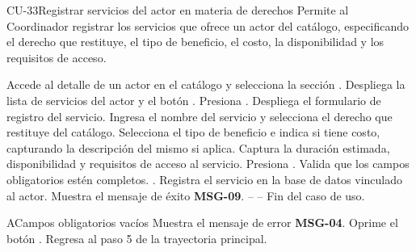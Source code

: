 \begin{UseCase}{CU-33}{Registrar servicios del actor en materia de derechos}{
	Permite al Coordinador registrar los servicios que ofrece un actor del catálogo, especificando el derecho que restituye, el tipo de beneficio, el costo, la disponibilidad y los requisitos de acceso.
}
\end{UseCase}

\begin{UCtrayectoria}
	\UCpaso[\UCactor] Accede al detalle de un actor en el catálogo y selecciona la sección .
	\UCpaso Despliega la lista de servicios del actor y el botón .
	\UCpaso[\UCactor] Presiona .
	\UCpaso Despliega el formulario de registro del servicio.
	\UCpaso[\UCactor] Ingresa el nombre del servicio y selecciona el derecho que restituye del catálogo.
	\UCpaso[\UCactor] Selecciona el tipo de beneficio e indica si tiene costo, capturando la descripción del mismo si aplica.
	\UCpaso[\UCactor] Captura la duración estimada, disponibilidad y requisitos de acceso al servicio.
	\UCpaso[\UCactor] Presiona .
	\UCpaso Valida que los campos obligatorios estén completos. .
	\UCpaso Registra el servicio en la base de datos vinculado al actor.
	\UCpaso Muestra el mensaje de éxito \textbf{MSG-09}.
	\UCpaso[] -- -- Fin del caso de uso.
\end{UCtrayectoria}

\begin{UCtrayectoriaA}{A}{Campos obligatorios vacíos}
	\UCpaso Muestra el mensaje de error \textbf{MSG-04}.
	\UCpaso[\UCactor] Oprime el botón .
	\UCpaso Regresa al paso 5 de la trayectoria principal.
\end{UCtrayectoriaA}

